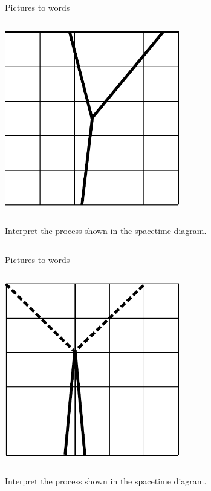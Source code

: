 \begin{frame}{Pictures to words}


  \begin{mycolumns}

    \begin{column}{.3\textwidth}\includegraphics[width=3in]{ch06/figs/to-words-1}\end{column}

    \begin{column}{.7\textwidth}

      Interpret the process shown in the spacetime diagram.

    \end{column}
  \end{mycolumns}

\end{frame}

\begin{frame}{Pictures to words}


  \begin{mycolumns}

    \begin{column}{.3\textwidth}\includegraphics[width=3in]{ch06/figs/to-words-2}\end{column}

    \begin{column}{.7\textwidth}

      Interpret the process shown in the spacetime diagram.

    \end{column}
  \end{mycolumns}

\end{frame}

